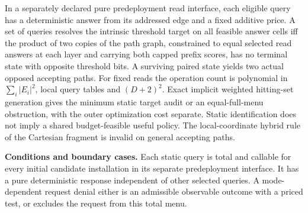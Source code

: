 \begin{theorem}\label{ext:t30c3}\label{ext:t30c}

In a separately declared pure predeployment read interface, each eligible query has a deterministic answer from its addressed edge and a fixed additive price. A set of queries resolves the intrinsic threshold target on all feasible answer cells iff the product of two copies of the path graph, constrained to equal selected read answers at each layer and carrying both capped prefix scores, has no terminal state with opposite threshold bits. A surviving paired state yields two actual opposed accepting paths. For fixed reads the operation count is polynomial in \(\sum_i |E_i|^2\), local query tables and \((D+2)^2\). Exact implicit weighted hitting-set generation gives the minimum static target audit or an equal-full-menu obstruction, with the outer optimization cost separate. Static identification does not imply a shared budget-feasible useful policy. The local-coordinate hybrid rule of the Cartesian fragment is invalid on general accepting paths.

\textbf{Conditions and boundary cases.} Each static query is total and callable for every initial candidate installation in its separate predeployment interface. It has a pure deterministic response independent of other selected queries. A mode-dependent request denial either is an admissible observable outcome with a priced test, or excludes the request from this total menu.

\end{theorem}

